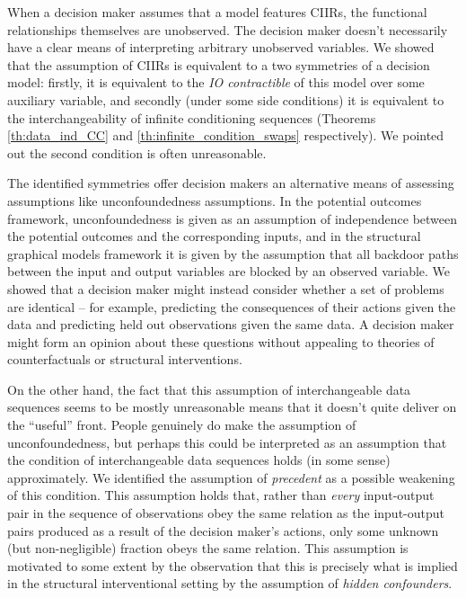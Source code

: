 When a decision maker assumes that a model features CIIRs, the functional relationships themselves are unobserved. The decision maker doesn't necessarily have a clear means of interpreting arbitrary unobserved variables. We showed that the assumption of CIIRs is equivalent to a two symmetries of a decision model: firstly, it is equivalent to the \emph{IO contractible} of this model over some auxiliary variable, and secondly (under some side conditions) it is equivalent to the interchangeability of infinite conditioning sequences (Theorems \ref{th:data_ind_CC} and \ref{th:infinite_condition_swaps} respectively). We pointed out the second condition is often unreasonable.

The identified symmetries offer decision makers an alternative means of assessing assumptions like unconfoundedness assumptions. In the potential outcomes framework, unconfoundedness is given as an assumption of independence between the potential outcomes and the corresponding inputs, and in the structural graphical models framework it is given by the assumption that all backdoor paths between the input and output variables are blocked by an observed variable. We showed that a decision maker might instead consider whether a set of problems are identical -- for example, predicting the consequences of their actions given the data and predicting held out observations given the same data. A decision maker might form an opinion about these questions without appealing to theories of counterfactuals or structural interventions.

On the other hand, the fact that this assumption of interchangeable data sequences seems to be mostly unreasonable means that it doesn't quite deliver on the ``useful'' front. People genuinely do make the assumption of unconfoundedness, but perhaps this could be interpreted as an assumption that the condition of interchangeable data sequences holds (in some sense) approximately. We identified the assumption of \emph{precedent} as a possible weakening of this condition. This assumption holds that, rather than \emph{every} input-output pair in the sequence of observations obey the same relation as the input-output pairs produced as a result of the decision maker's actions, only some unknown (but non-negligible) fraction obeys the same relation. This assumption is motivated to some extent by the observation that this is precisely what is implied in the structural interventional setting by the assumption of \emph{hidden confounders}.


